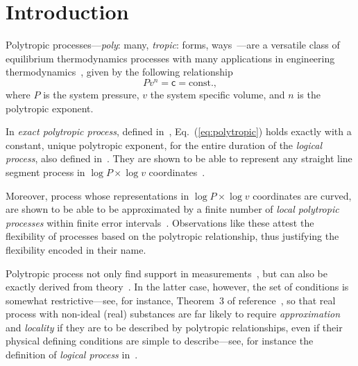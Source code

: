 \section{Introduction}

    Polytropic        processes---\emph{poly}:        many,        \emph{tropic}:         forms,
    ways~\cite{2020-NaaktgeborenC-engrXiv}---are a versatile class of equilibrium thermodynamics
    processes          with          many          applications          in          engineering
    thermodynamics~\cite{2002-MoranMJ+ShapiroHN-LTC,                 2013-CengelYA+BolesMA-AMGH,
    2015-KroosKA+PotterMC-Cengage,  1986-JonesJB+HawkinsGA-Wiley},  given   by   the   following
    relationship
    \begin{equation}
        Pv^n = \mathsf{c} = \mbox{const.},
        \label{eq:polytropic}
    \end{equation}
    \noindent where $P$ is the system pressure, $v$ the system specific volume, and $n$  is  the
    polytropic exponent.

    In   \emph{exact   polytropic   process},   defined    in~\cite{2020-NaaktgeborenC-engrXiv},
    Eq.~(\ref{eq:polytropic}) holds exactly with a constant, unique polytropic exponent, for the
    entire     duration     of      the      \emph{logical      process},      also      defined
    in~\cite{2020-NaaktgeborenC-engrXiv}. They are shown to be able to  represent  any  straight
    line      segment      process       in       $\log       P       \times       \log       v$
    coordinates~\cite{2020-NaaktgeborenC-engrXiv}.

    Moreover, process whose representations in $\log P \times \log v$  coordinates  are  curved,
    are shown to be able to be  approximated  by  a  finite  number  of  \emph{local  polytropic
    processes} within  finite  error  intervals~\cite{2020-NaaktgeborenC-engrXiv}.  Observations
    like these attest the flexibility of processes based on the  polytropic  relationship,  thus
    justifying the flexibility encoded in their name.

    Polytropic process not only find support  in  measurements~\cite{2013-CengelYA+BolesMA-AMGH,
    2002-MoranMJ+ShapiroHN-LTC,  1985-WylenG-Wiley},  but  can  also  be  exactly  derived  from
    theory~\cite{2012-ChristiansJ-IntJMechEngEduc, 2020-NaaktgeborenC-engrXiv}.  In  the  latter
    case, however, the set of conditions is somewhat restrictive---see, for instance,  Theorem~3
    of reference~\cite{2020-NaaktgeborenC-engrXiv}, so that real process with  non-ideal  (real)
    substances are far likely to require \emph{approximation} and \emph{locality} if they are to
    be described by polytropic relationships, even if their  physical  defining  conditions  are
    simple  to  describe---see,  for  instance  the   definition   of   \emph{logical   process}
    in~\cite{2020-NaaktgeborenC-engrXiv}.

